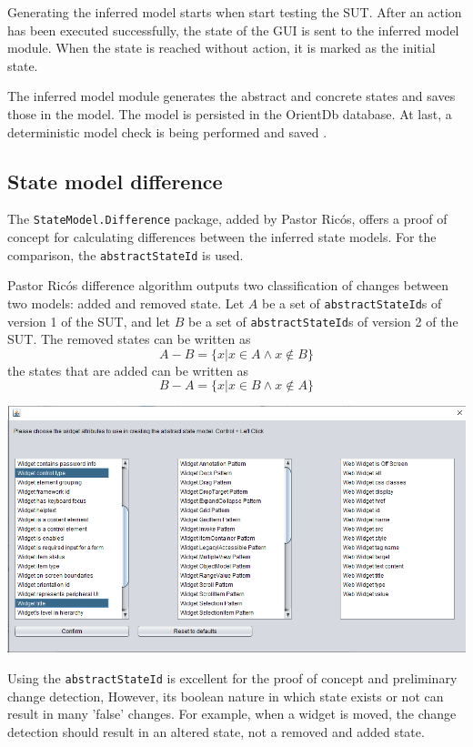 Generating the inferred model starts when \testar start testing the SUT. After an action has been executed successfully, the state of the GUI is sent to the inferred model module. When the state is reached without action, it is marked as the initial state. 

The inferred model module generates the abstract and concrete states and saves those in the model. The model is persisted in the OrientDb database. At last, a deterministic model check is being performed and saved \cite{testar-code}.

\subsection{State model difference} \label{sec:state-model-difference}
The \verb|StateModel.Difference| package, added by Pastor Ricós\cite{stateDiff}, offers a proof of concept for calculating differences between the inferred state models. For the comparison, the \verb|abstractStateId| is used. 

Pastor Ricós difference algorithm\cite{stateDiff} outputs two classification of changes between two models: added and removed state. Let $A$ be a set of \verb|abstractStateId|s of version 1 of the SUT, and let $B$ be a set of \verb|abstractStateId|s of version 2 of the SUT. The removed states can be written as
\[A-B = \lbrace x | x \in A \wedge x \notin B \rbrace\]
the states that are added can be written as
\[B-A = \lbrace x | x \in B \wedge x \notin A \rbrace\]

\begingroup
\captionsetup{type=figure}
\includegraphics[scale=0.5]{images/attributes-state-model.png}
\label{fig:advance}
\endgroup

Using the \verb|abstractStateId| is excellent for the proof of concept and preliminary change detection, 
However, its boolean nature in which state exists or not can result in many 'false' changes. For example, when a widget is moved, the change detection should result in an altered state, not a removed and added state. 

